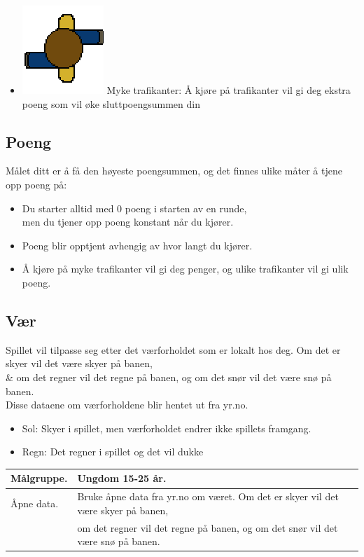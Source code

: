 \documentclass[paper=a4]{article}
\begin{document}
\begin{itemize}
	\item \includegraphics[scale=0.4]{images/walker.png} Myke trafikanter: Å kjøre på trafikanter vil gi deg ekstra poeng som vil øke sluttpoengsummen din 
\end{itemize}

\subsection{Poeng}
Målet ditt er å få den høyeste poengsummen, og det finnes ulike måter å tjene opp poeng på:
\begin{itemize}
	\item Du starter alltid med 0 poeng i starten av en runde, \\men du tjener opp poeng konstant når du kjører.
	\item Poeng blir opptjent avhengig av hvor langt du kjører. 
	\item Å kjøre på myke trafikanter vil gi deg penger, og ulike trafikanter vil gi ulik poeng.
\end{itemize}

\subsection{Vær} 
Spillet vil tilpasse seg etter det værforholdet som er lokalt hos deg. Om det er skyer vil det være skyer på banen,\\&
om det regner vil det regne på banen, og om det snør vil det være snø på banen. \\
Disse dataene om værforholdene blir hentet ut fra yr.no. 
\begin{itemize} 
	\item Sol: Skyer i spillet, men værforholdet endrer ikke spillets framgang.
	\item Regn: Det regner i spillet og det vil dukke 
\end{itemize}
\newpage

\begin{center}
\begin{tabular}{ | m{5cm} | m{8cm} | }
\hline
Målgruppe. & Ungdom 15-25 år. \\ \hline



Åpne data. & Bruke åpne data fra yr.no om været. Om det er skyer vil det være skyer på banen,\\&
om det regner vil det regne på banen, og om det snør vil det være snø på banen.\\ \hline
\end{tabular}
\end{center}
\end{document}

